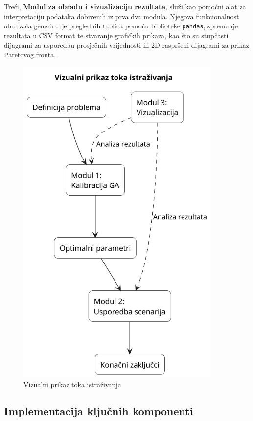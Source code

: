     Treći, \textbf{Modul za obradu i vizualizaciju rezultata}, služi kao pomoćni alat za interpretaciju podataka dobivenih iz prva dva modula. Njegova funkcionalnost obuhvaća generiranje preglednih tablica pomoću biblioteke \texttt{pandas}, spremanje rezultata u CSV format te stvaranje grafičkih prikaza, kao što su stupčasti dijagrami za usporedbu prosječnih vrijednosti ili 2D raspršeni dijagrami za prikaz Paretovog fronta.
\begin{figure}[H]
    \centering
    \includegraphics[width=0.9\textwidth]{slike/tijek_istrazivanja.png}
    \caption{Vizualni prikaz toka istraživanja}
    \label{fig:tok_istrazivanja}
\end{figure}
\subsection{Implementacija ključnih komponenti}

